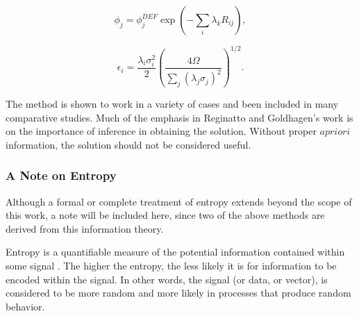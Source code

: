 \begin{equation}
\label{eqn:maxed-flux}
\phi_j = \phi_j^{DEF} \exp(- \sum_i \lambda_k R_{ij}) ,
\end{equation}

\begin{equation}
\label{eqn:maxed-error}
\epsilon_i = \frac{\lambda_i \sigma_i^2}{2} (\frac{4 \Omega}{\sum_j (\lambda_j \sigma_j)^2})^{1/2} .
\end{equation}

The method is shown to work in a variety of cases and been included in many comparative studies.
Much of the emphasis in Reginatto and Goldhagen's work is on the importance of inference in obtaining the solution.
Without proper $a priori$ information, the solution should not be considered useful.


\subsubsection{A Note on Entropy}
Although a formal or complete treatment of entropy extends beyond the scope of this work, a note will be included here, since two of the above methods are derived from this information theory.

Entropy is a quantifiable measure of the potential information contained within some signal \cite{guiasu1985principle}.
The higher the entropy, the less likely it is for information to be encoded within the signal.
In other words, the signal (or data, or vector), is considered to be more random and more likely in processes that produce random behavior.

